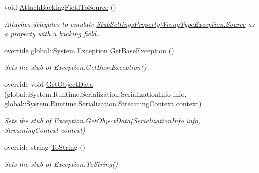 \begin{DoxyCompactItemize}
void \hyperlink{class_system_1_1_configuration_1_1_fakes_1_1_stub_settings_property_wrong_type_exception_a479db05a478b18bd0381fe87ba7b3029}{Attach\-Backing\-Field\-To\-Source} ()
\begin{DoxyCompactList}\small\item\em Attaches delegates to emulate \hyperlink{class_system_1_1_configuration_1_1_fakes_1_1_stub_settings_property_wrong_type_exception_ad64f6c50ddbc348ffffb60f73ef8476f}{Stub\-Settings\-Property\-Wrong\-Type\-Exception.\-Source} as a property with a backing field.\end{DoxyCompactList}\item 
override global\-::\-System.\-Exception \hyperlink{class_system_1_1_configuration_1_1_fakes_1_1_stub_settings_property_wrong_type_exception_a60d682aadc8b5adcf2ae81520a11c4e8}{Get\-Base\-Exception} ()
\begin{DoxyCompactList}\small\item\em Sets the stub of Exception.\-Get\-Base\-Exception()\end{DoxyCompactList}\item 
override void \hyperlink{class_system_1_1_configuration_1_1_fakes_1_1_stub_settings_property_wrong_type_exception_abcb824151e19d84483a7e13b1949985f}{Get\-Object\-Data} (global\-::\-System.\-Runtime.\-Serialization.\-Serialization\-Info info, global\-::\-System.\-Runtime.\-Serialization.\-Streaming\-Context context)
\begin{DoxyCompactList}\small\item\em Sets the stub of Exception.\-Get\-Object\-Data(\-Serialization\-Info info, Streaming\-Context context)\end{DoxyCompactList}\item 
override string \hyperlink{class_system_1_1_configuration_1_1_fakes_1_1_stub_settings_property_wrong_type_exception_ae615e36b0f20426f125e62786ffa120f}{To\-String} ()
\begin{DoxyCompactList}\small\item\em Sets the stub of Exception.\-To\-String()\end{DoxyCompactList}\end{DoxyCompactItemize}

